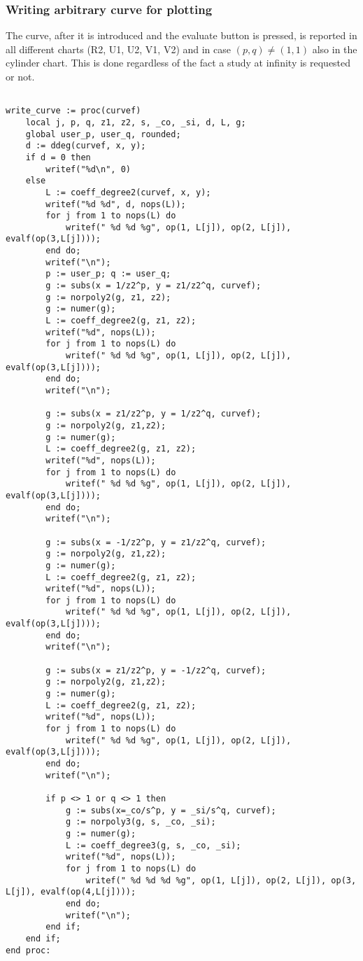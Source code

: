 \documentclass[a4paper,10pt]{article}
\begin{document}
\subsubsection{Writing arbitrary curve for plotting}

The curve, after it is introduced and the evaluate button is pressed, is reported in all different charts (R2, U1, U2, V1, V2) and in case $(p,q)\not=(1,1)$ also in the cylinder chart.  This is done regardless of the fact a study at infinity is requested or not.

\begin{lstlisting}[name=writelog2]

write_curve := proc(curvef)
    local j, p, q, z1, z2, s, _co, _si, d, L, g;
    global user_p, user_q, rounded;
    d := ddeg(curvef, x, y);
    if d = 0 then
        writef("%d\n", 0)
    else
        L := coeff_degree2(curvef, x, y);
        writef("%d %d", d, nops(L));
        for j from 1 to nops(L) do
            writef(" %d %d %g", op(1, L[j]), op(2, L[j]), evalf(op(3,L[j])));
        end do;
        writef("\n");
        p := user_p; q := user_q;
        g := subs(x = 1/z2^p, y = z1/z2^q, curvef);
        g := norpoly2(g, z1, z2);
        g := numer(g);
        L := coeff_degree2(g, z1, z2);
        writef("%d", nops(L));
        for j from 1 to nops(L) do
            writef(" %d %d %g", op(1, L[j]), op(2, L[j]), evalf(op(3,L[j])));
        end do;
        writef("\n");

        g := subs(x = z1/z2^p, y = 1/z2^q, curvef);
        g := norpoly2(g, z1,z2);
        g := numer(g);
        L := coeff_degree2(g, z1, z2);
        writef("%d", nops(L));
        for j from 1 to nops(L) do
            writef(" %d %d %g", op(1, L[j]), op(2, L[j]), evalf(op(3,L[j])));
        end do;
        writef("\n");

        g := subs(x = -1/z2^p, y = z1/z2^q, curvef);
        g := norpoly2(g, z1,z2);
        g := numer(g);
        L := coeff_degree2(g, z1, z2);
        writef("%d", nops(L));
        for j from 1 to nops(L) do
            writef(" %d %d %g", op(1, L[j]), op(2, L[j]), evalf(op(3,L[j])));
        end do;
        writef("\n");

        g := subs(x = z1/z2^p, y = -1/z2^q, curvef);
        g := norpoly2(g, z1,z2);
        g := numer(g);
        L := coeff_degree2(g, z1, z2);
        writef("%d", nops(L));
        for j from 1 to nops(L) do
            writef(" %d %d %g", op(1, L[j]), op(2, L[j]), evalf(op(3,L[j])));
        end do;
        writef("\n");

        if p <> 1 or q <> 1 then
            g := subs(x=_co/s^p, y = _si/s^q, curvef);
            g := norpoly3(g, s, _co, _si);
            g := numer(g);
            L := coeff_degree3(g, s, _co, _si);
            writef("%d", nops(L));
            for j from 1 to nops(L) do
                writef(" %d %d %d %g", op(1, L[j]), op(2, L[j]), op(3, L[j]), evalf(op(4,L[j])));
            end do;
            writef("\n");
        end if;
    end if;
end proc:
\end{lstlisting}
\end{document}
